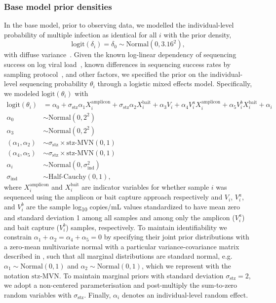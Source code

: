 \documentclass[10pt,letterpaper]{article}
\begin{document}
\subsubsection{Base model prior densities}
In the base model, prior to observing data, we modelled the individual-level probability of multiple infection as identical for all $i$ with the prior density, 
\begin{equation}
\label{eq:model_prob_mi}
\text{logit}\left(\delta_i\right) = \delta_0 \sim \text{Normal}(0,3.16^2),
\end{equation}
with diffuse variance~\cite{stan2024}. Given the known log-linear dependency of sequencing success on log viral load~\cite{bonsall2020}, known differences in sequencing success rates by sampling protocol~\cite{monod2024}, and other factors, we specified the prior on the individual-level sequencing probability $\theta_i$ through a logistic mixed effects model. Specifically, we modeled $\text{logit}(\theta_i)$ with 
\begin{subequations}
\begin{align}
\text{logit}\left(\theta_i\right) &= 
\alpha_0 + \sigma_{\text{stz}}\alpha_1 X^{\text{amplicon}}_i + \sigma_{\text{stz}}\alpha_2 X^{\text{bait}}_i + \alpha_3 V_i+ \alpha_4 V_i^a X^{\text{amplicon}}_i + \alpha_5 V_i^bX^{\text{bait}}_i + \alpha_i \\
\alpha_0 &\sim \text{Normal}(0,2^2) \\
\alpha_3 &\sim \text{Normal}(0,2^2) \\
(\alpha_1,\alpha_2) &\sim \sigma_{\text{stz}}\times\text{stz-MVN}(0,1)\\
(\alpha_4,\alpha_5) &\sim \sigma_{\text{stz}}\times\text{stz-MVN}(0,1)\\
\alpha_i &\sim \text{Normal}(0,\sigma_{\text{ind}}^2)\\
\sigma_{\text{ind}} &\sim \text{Half-Cauchy}(0,1),
\end{align}
\label{eq:base_priors}
\end{subequations}
where $X^{\text{amplicon}}_i$ and $X^{\text{bait}}_i$ are indicator variables for whether sample $i$ was sequenced using the amplicon or bait capture approach respectively and $V_i$, $V_i^a$, and $V_i^b$ are the sample log\textsubscript{10} copies/mL values standardized to have mean zero and standard deviation 1 among all samples and among only the amplicon ($V_i^a$) and bait capture ($V_i^b$) samples, respectively. To maintain identifiability we constrain $\alpha_1 + \alpha_2 = \alpha_4 + \alpha_5 = 0$ by specifying their joint prior distributions with a zero-mean multivariate normal with a particular variance-covariance matrix described in \cite{stan2024}, such that all marginal distributions are standard normal, e.g. $\alpha_1 \sim \text{Normal}(0,1)$ and $\alpha_2 \sim \text{Normal}(0,1)$, which we represent with the notation $\text{stz-MVN}$. To maintain marginal priors with standard deviation $\sigma_{\text{stz}}=2$, we adopt a non-centered parameterisation and post-multiply the sum-to-zero random variables with $\sigma_{\text{stz}}$. Finally, $\alpha_i$ denotes an individual-level random effect.
\end{document}
